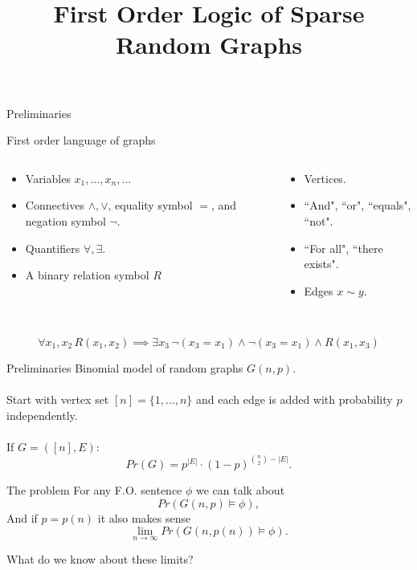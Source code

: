 \documentclass[handout, 11pt]{beamer}
\title[First Order Logic of Sparse Random Graphs]{First Order
Logic of Sparse Random Graphs}
\newcommand{\Ln}{\lim\limits_{n\to \infty}}
\begin{document}
	\frame{\titlepage}

\begin{frame}{Preliminaries}
\begin{center}
	\large{First order language of graphs}
\end{center}
\begin{columns}
	\begin{column}{0.55\textwidth}
		\begin{itemize}
			\item Variables $x_1, \dots, x_n, \dots$
			\item Connectives $\wedge, \vee$, equality symbol $=$,
			and negation symbol $\neg$.
			\item Quantifiers $\forall, \exists$.
			\item A binary relation symbol $R$
		\end{itemize}
	\end{column}
		\begin{column}{0.45\textwidth}
		\begin{itemize}
			\item Vertices.
			\item ``And", ``or", ``equals", ``not".
			\item ``For all", ``there exists".
			\item Edges $x\sim y$. 
		\end{itemize}
	\end{column}
\end{columns}
~\\
\[ \forall x_1,x_2 \, R(x_1,x_2) \implies \exists x_3 \,
 \neg(x_3=x_1)\wedge \neg(x_3=x_1) \wedge R(x_1, x_3)\]
\end{frame}

\begin{frame}{Preliminaries}
	\Large{Binomial model of random graphs $G(n,p)$.} \\
	\large
	~\\
	Start with vertex set $[n]=\{1,\dots, n\}$ and
	each edge is added with probability $p$ independently. 
	\\~\\
	If $G=([n], E)$:
	\[ Pr(G)= p^{|E|}\cdot (1-p)^{\binom{n}{2}- |E|}. \]
	
\end{frame}

\begin{frame}{The problem}
For any F.O. sentence $\phi$ we can talk about
\[ Pr(G(n,p)\models \phi ), \]
And if $p=p(n)$ it also makes sense
\[ \Ln Pr(G(n,p(n))\models \phi) .\] 

What do we know about these limits?

\end{frame} 
\end{document}
